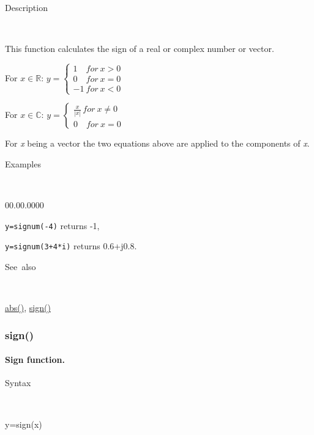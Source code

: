 \begin{description}
\item [Description]~
\end{description}
This function calculates the sign of a real or complex number or vector.

\medskip{}
For $x\in\mathbb{R}$: $y=\left\{ \begin{array}{l}
1\quad for\: x>0\\
0\quad for\: x=0\\
-1\: for\: x<0\end{array}\right.$ 
\medskip{}

For $x\in\mathbb{C}$: $y=\left\{ \begin{array}{l}
{\displaystyle \frac{x}{\left|x\right|}}\, for\: x\neq0\\
0\quad for\: x=0\end{array}\right.$
\medskip{}

For \textit{x} being a vector the two equations above are
applied to the components of \textit{x}.

\begin{description}
\item [Examples]~
\end{description}
\begin{lyxlist}{00.00.0000}
\item [\texttt{y=signum(-4)}]returns -1,
\item [\texttt{y=signum(3+4{*}i)}]returns 0.6+j0.8.
\end{lyxlist}
\begin{description}
\item [See~also]~
\end{description}
\textcolor{blue}{\hyperlink{abs}{abs()}}, \textcolor{blue}{\hyperlink{sign}{sign()}}


\newpage
\subsubsection*{\hypertarget{sign}{}{\Large sign()}}


\paragraph{\label{par:Sign}Sign function.}

\begin{description}
\item [Syntax]~
\end{description}
y=sign(x)

